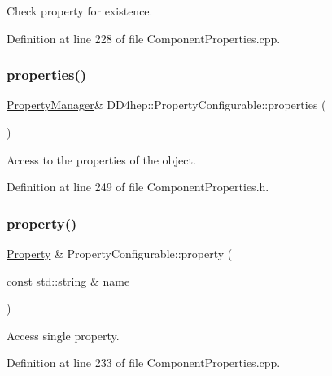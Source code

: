 Check property for existence. 



Definition at line 228 of file Component\+Properties.\+cpp.

\hypertarget{class_d_d4hep_1_1_property_configurable_af6f3ad08d1cb9d831d8f89255c403d1c}{}\label{class_d_d4hep_1_1_property_configurable_af6f3ad08d1cb9d831d8f89255c403d1c} 
\subsubsection{\texorpdfstring{properties()}{properties()}}
{\footnotesize\ttfamily \hyperlink{class_d_d4hep_1_1_property_manager}{Property\+Manager}\& D\+D4hep\+::\+Property\+Configurable\+::properties (\begin{DoxyParamCaption}{ }\end{DoxyParamCaption})\hspace{0.3cm}{\ttfamily [inline]}}



Access to the properties of the object. 



Definition at line 249 of file Component\+Properties.\+h.

\hypertarget{class_d_d4hep_1_1_property_configurable_a01af296a9510638b4a1818fb0baef5c5}{}\label{class_d_d4hep_1_1_property_configurable_a01af296a9510638b4a1818fb0baef5c5} 
\subsubsection{\texorpdfstring{property()}{property()}}
{\footnotesize\ttfamily \hyperlink{class_d_d4hep_1_1_property}{Property} \& Property\+Configurable\+::property (\begin{DoxyParamCaption}\item[{const std\+::string \&}]{name }\end{DoxyParamCaption})}



Access single property. 



Definition at line 233 of file Component\+Properties.\+cpp.



